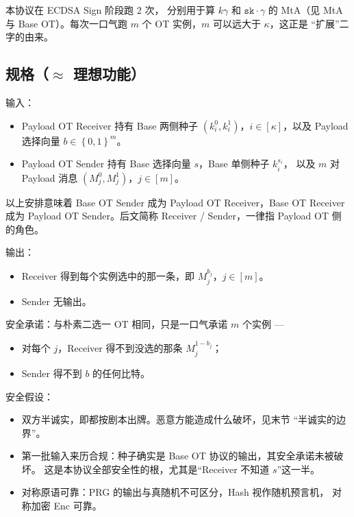 本协议在 ECDSA Sign 阶段跑 2 次，
分别用于算 $k\gamma$ 和 $\mathtt{sk}\cdot\gamma$ 的 MtA（见 MtA 与 Base
OT）。每次一口气跑 $m$ 个 OT 实例，$m$ 可以远大于 $\kappa$，这正是
“扩展”二字的由来。

\subsection{\texorpdfstring{规格（$\approx$ 理想功能）}{规格（\textbackslash approx 理想功能）}}

输入：

\begin{itemize}

\item
  Payload OT Receiver 持有 Base
  两侧种子 $\left(k^0_i, k^1_i\right)$，$i\in[\kappa]$，以及 Payload
  选择向量 $b \in \left\{0,1\right\}^m$。
\item
  Payload OT Sender 持有 Base 选择向量 $s$，Base 单侧种子 $k^{s_i}_i$，
  以及 $m$ 对 Payload 消息 $\left(M^0_j, M^1_j\right)$，$j\in[m]$。
\end{itemize}

以上安排意味着 Base OT Sender 成为 Payload OT Receiver，Base OT Receiver
成为 Payload OT Sender。后文简称 Receiver / Sender，一律指 Payload OT
侧的角色。

输出：

\begin{itemize}

\item
  Receiver 得到每个实例选中的那一条，即 $M^{b_j}_j$，$j\in[m]$。
\item
  Sender 无输出。
\end{itemize}

安全承诺：与朴素二选一 OT 相同，只是一口气承诺 $m$ 个实例 ---

\begin{itemize}

\item
  对每个 $j$，Receiver 得不到没选的那条 $M^{1-b_j}_j$；
\item
  Sender 得不到 $b$ 的任何比特。
\end{itemize}

安全假设：

\begin{itemize}

\item
  双方半诚实，即都按剧本出牌。恶意方能造成什么破坏，见末节
“半诚实的边界”。
\item
  第一批输入来历合规：种子确实是 Base OT 协议的输出，其安全承诺未被破坏。
  这是本协议全部安全性的根，尤其是“Receiver 不知道 $s$”这一半。
\item
  对称原语可靠：PRG 的输出与真随机不可区分，Hash 视作随机预言机，
  对称加密 Enc 可靠。
\end{itemize}

